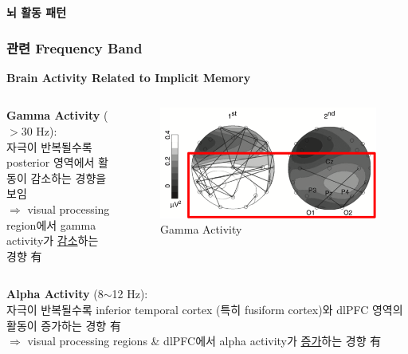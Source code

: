 \documentclass{beamer}
\begin{document}
\begin{frame}{\textbf{뇌 활동 패턴}}
\begin{itemize}
  \end{itemize}
\end{frame}

\subsubsection{관련 Frequency Band}
\begin{frame}{\textbf{Brain Activity Related to Implicit Memory}}
    \begin{columns}
    \begin{column}{0.62\textwidth}
      \large
      \textbf{Gamma Activity} ($>$30 Hz):\\
      자극이 반복될수록 posterior 영역에서 활동이 감소하는 경향을 보임\\
      {\color{blue} $\Rightarrow$ visual processing region에서 gamma activity가 \underline{감소}하는 경향 有}
    \end{column}
    \hfill
    \begin{column}{0.38\textwidth}
      \centering
      \begin{figure}
        \centering
        \includegraphics[width=\textwidth]{image/gamma_im}
        \caption{Gamma Activity}
      \end{figure}
    \end{column}
  \end{columns}
  \begin{columns}
    \begin{column}{0.62\textwidth}
      \large
      \textbf{Alpha Activity} (8$\sim$12 Hz):\\
      자극이 반복될수록 inferior temporal cortex 
(특히 fusiform cortex)와 dlPFC 영역의 활동이 증가하는 경향 有\\
      {\color{blue} $\Rightarrow$ visual processing regions \& dlPFC에서 alpha activity가 \underline{증가}하는 경향 有}
    \end{column}

\end{columns}
\end{frame}
\end{document}
